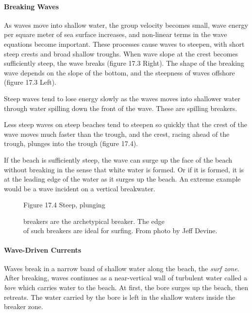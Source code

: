 \paragraph{Breaking Waves}
As waves move into shallow water, the group
velocity becomes small, wave energy per square meter of sea surface
increases, and non-linear terms in the wave equations become
important. These processes cause waves to steepen, with short steep
crests and broad shallow troughs. When wave slope at the crest becomes
sufficiently steep, the wave breaks (figure 17.3 Right). The shape of
the breaking wave depends on the slope of the bottom, and the
steepness of waves offshore (figure 17.3 Left).
\begin{enumerate}
\vitem Steep waves tend to lose energy slowly as the waves moves into
shallower water through water spilling down the front of the
wave. These are spilling breakers.

\vitem Less steep waves on steep beaches tend to steepen so quickly
that the crest of the wave moves much faster than the trough, and the
crest, racing ahead of the trough, plunges
into the trough (figure 17.4).

\vitem If the beach is sufficiently steep, the wave can
surge up the face of the beach without
breaking in the sense that white water is formed. Or if it is formed,
it is at the leading edge of the water as it surges up the beach. An
extreme example would be a wave incident on a vertical breakwater.
\end{enumerate}

\begin{figure}[t!]
\centering
\footnotesize
Figure 17.4 Steep, plunging
\rule{0pt}{4ex}breakers are the archetypical
breaker. The edge\\of such breakers are ideal for surfing. From photo
by Jeff Devine.

\label{fig:wavecropped}
\vspace{-3ex}
\end{figure}

\paragraph{Wave-Driven Currents}
Waves break in a
narrow band of shallow water along the beach, the \textit{surf
  zone}. After breaking, waves continues as a
near-vertical wall of turbulent water called a
\textit{bore} which carries water to the beach. At
first, the bore surges up the beach, then retreats. The water carried
by the bore is left in the shallow waters inside the
breaker zone.

